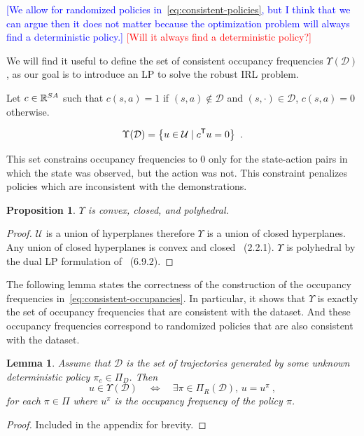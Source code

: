 \documentclass[11pt]{article}
\newtheorem{lemma}{Lemma}
\newtheorem{proposition}{Proposition}
\newcommand{\mm}[1]{\textcolor{blue}{[#1]}}
\newcommand{\gersi}[1]{\textcolor{red}{[#1]}}
\begin{document}
\mm{We allow for randomized policies in~\eqref{eq:consistent-policies}, but I
	think that we can argue then it does not matter because the optimization problem
	will always find a deterministic policy.}
\gersi{Will it always find a deterministic policy?}

We will find it useful to define the set of consistent occupancy frequencies $\Upsilon(\mathcal{D})$, as our goal is to introduce an LP to solve
the robust IRL problem.

Let $c \in \mathbb{R}^{SA}$ such that $c(s,a) = 1$ if $(s,a) \notin \mathcal{D}$ and $(s, \cdot) \in \mathcal{D}$, $c(s,a)  = 0$ otherwise.

\begin{equation}\label{eq:consistent-occupancies}
	\Upsilon(\mathcal{D}) = \left\{ u \in \mathcal{U} \mid c^{\mathsf{T}} u = 0  \right\}~.
\end{equation}

This set constrains occupancy frequencies to 0 only for the state-action pairs in which the state was observed, but the action was not.
This constraint penalizes policies which are inconsistent with the demonstrations.

\begin{proposition}\label{prop:convexity_of_Upsilon}
	$\Upsilon$ is convex, closed, and polyhedral.
\end{proposition}

\begin{proof}
	$\mathcal{U}$ is a union of hyperplanes therefore $\Upsilon$ is a union of
	closed hyperplanes. Any union of closed hyperplanes is convex and closed~\cite{boyd_convex_optimization} (2.2.1).
	$\Upsilon$ is polyhedral by the dual LP formulation of~\cite{Puterman1994} (6.9.2).
\end{proof}

The following lemma states the correctness of the construction of the occupancy
frequencies in~\eqref{eq:consistent-occupancies}. In particular, it shows that
$\Upsilon$ is exactly the set of occupancy frequencies that are consistent with the
dataset. And these occupancy frequencies correspond to randomized policies that are also consistent with the dataset.

\begin{lemma}\label{lemma:occ_freq_matching}
	Assume that $\mathcal{D}$ is the set of trajectories generated by some unknown deterministic policy $\pi_e \in \Pi_D$. Then
	\[
		u \in \Upsilon(\mathcal{D})  \quad \Leftrightarrow \quad  \exists \pi \in \Pi_R(\mathcal{D}), \, u = u^{\pi}~,
	\]
	for each $\pi \in \Pi$ where $u^{\pi}$ is the occupancy frequency of the policy $\pi$.
\end{lemma}
\begin{proof}
	Included in the appendix for brevity.
\end{proof}
\end{document}
